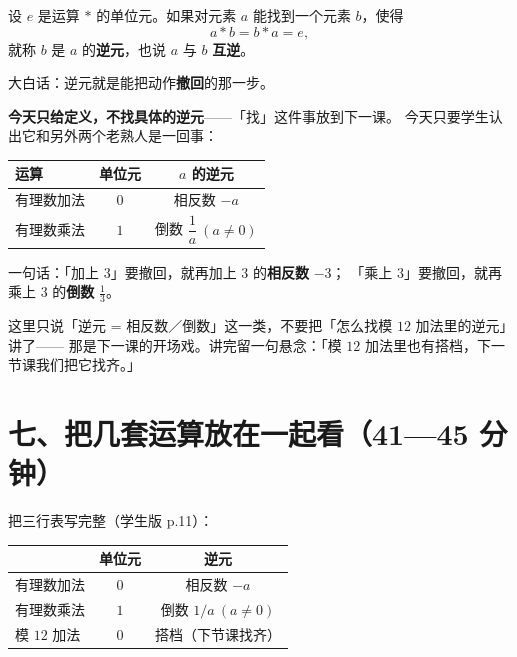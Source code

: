 \begin{definition}[逆元]
  设 \(e\) 是运算 \(*\) 的单位元。如果对元素 \(a\) 能找到一个元素 \(b\)，使得
  \[
    a*b=b*a=e,
  \]
  就称 \(b\) 是 \(a\) 的\textbf{逆元}，也说 \(a\) 与 \(b\) \textbf{互逆}。
\end{definition}

\noindent 大白话：逆元就是能把动作\textbf{撤回}的那一步。

\noindent\textbf{今天只给定义，不找具体的逆元}——「找」这件事放到下一课。
今天只要学生认出它和另外两个老熟人是一回事：

\begin{center}
\begin{tabular}{@{}lcc@{}}
  \toprule
  运算 & 单位元 & \(a\) 的逆元 \\
  \midrule
  有理数加法 & \(0\) & 相反数 \(-a\) \\
  有理数乘法 & \(1\) & 倒数 \(\dfrac{1}{a}\ (a\neq 0)\) \\
  \bottomrule
\end{tabular}
\end{center}

一句话：「加上 \(3\)」要撤回，就再加上 \(3\) 的\textbf{相反数} \(-3\)；
「乘上 \(3\)」要撤回，就再乘上 \(3\) 的\textbf{倒数} \(\frac13\)。

\begin{zhu}
  这里只说「逆元 = 相反数／倒数」这一类，不要把「怎么找模 \(12\) 加法里的逆元」讲了——
  那是下一课的开场戏。讲完留一句悬念：「模 \(12\) 加法里也有搭档，下一节课我们把它找齐。」
\end{zhu}

\section*{七、把几套运算放在一起看（41—45 分钟）}

\noindent 把三行表写完整（学生版 p.11）：

\begin{center}
\begin{tabular}{@{}lcc@{}}
  \toprule
   & \textbf{单位元} & \textbf{逆元} \\
  \midrule
  有理数加法 & \(0\) & 相反数 \(-a\) \\
  有理数乘法 & \(1\) & 倒数 \(1/a\ (a\neq0)\) \\
  模 \(12\) 加法 & \(0\) & 搭档（下节课找齐） \\
  \bottomrule
\end{tabular}
\end{center}

